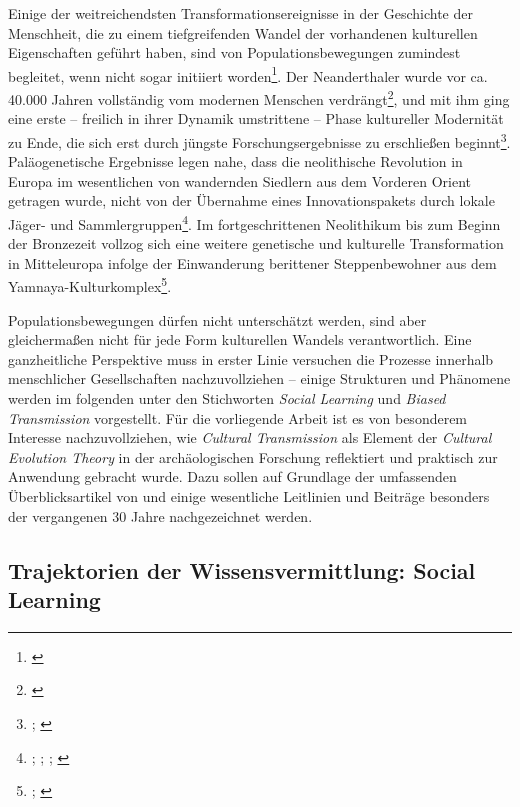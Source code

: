 \documentclass[openany,twoside,twocolumn]{book}
\let\rmarkdownfootnote\footnote%
\def\footnote{\protect\rmarkdownfootnote}
\begin{document}
Einige der weitreichendsten Transformationsereignisse in der Geschichte
der Menschheit, die zu einem tiefgreifenden Wandel der vorhandenen
kulturellen Eigenschaften geführt haben, sind von Populationsbewegungen
zumindest begleitet, wenn nicht sogar initiiert worden\footnote{\textcite{boyd_voting_2009}}.
Der Neanderthaler wurde vor ca. 40.000 Jahren vollständig vom modernen
Menschen verdrängt\footnote{\textcite{skoglund_origins_2012}}, und mit
ihm ging eine erste -- freilich in ihrer Dynamik umstrittene -- Phase
kultureller Modernität zu Ende, die sich erst durch jüngste
Forschungsergebnisse zu erschließen beginnt\footnote{\textcite{hoffmann_symbolic_2018};
  \textcite{tuniz_did_2012}}. Paläogenetische Ergebnisse legen nahe,
dass die neolithische Revolution in Europa im wesentlichen von
wandernden Siedlern aus dem Vorderen Orient getragen wurde, nicht von
der Übernahme eines Innovationspakets durch lokale Jäger- und
Sammlergruppen\footnote{\textcite{aoki_travelling_1996};
  \textcite{bar-yosef_nature_1998}; \textcite{patterson_modelling_2010};
  \textcite{skoglund_origins_2012}}. Im fortgeschrittenen Neolithikum
bis zum Beginn der Bronzezeit vollzog sich eine weitere genetische und
kulturelle Transformation in Mitteleuropa infolge der Einwanderung
berittener Steppenbewohner aus dem Yamnaya-Kulturkomplex\footnote{\textcite{allentoft_population_2015};
  \textcite{goldberg_ancient_2017}}.

Populationsbewegungen dürfen nicht unterschätzt werden, sind aber
gleichermaßen nicht für jede Form kulturellen Wandels verantwortlich.
Eine ganzheitliche Perspektive muss in erster Linie versuchen die
Prozesse innerhalb menschlicher Gesellschaften nachzuvollziehen --
einige Strukturen und Phänomene werden im folgenden unter den
Stichworten \emph{Social Learning} und \emph{Biased Transmission}
vorgestellt. Für die vorliegende Arbeit ist es von besonderem Interesse
nachzuvollziehen, wie \emph{Cultural Transmission} als Element der
\emph{Cultural Evolution Theory} in der archäologischen Forschung
reflektiert und praktisch zur Anwendung gebracht wurde. Dazu sollen auf
Grundlage der umfassenden Überblicksartikel von
\textcite{eerkens_cultural_2007} und \textcite{garvey_current_2018-1}
einige wesentliche Leitlinien und Beiträge besonders der vergangenen 30
Jahre nachgezeichnet werden.

\hypertarget{social-learning}{%
\subsection{Trajektorien der Wissensvermittlung: Social
Learning}\label{social-learning}}
\end{document}
